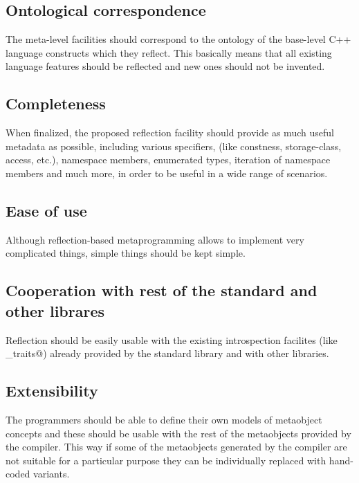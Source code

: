\subsection{Ontological correspondence}

The meta-level facilities should
correspond to the ontology of the base-level C++ language constructs
which they reflect. This basically means that all existing language
features should be reflected and new ones should not be invented.

\subsection{Completeness}

When finalized, the proposed reflection facility should
provide as much useful metadata as possible, including various specifiers,
(like constness, storage-class, access, etc.), namespace members,
enumerated types, iteration of namespace members and much more,
in order to be useful in a wide range of scenarios.

\subsection{Ease of use}

Although reflection-based metaprogramming
allows to implement very complicated things, simple things
should be kept simple.

\subsection{Cooperation with rest of the standard and other librares}

Reflection should be easily
usable with the existing introspection facilites (like \verb@type_traits@)
already provided by the standard library and with other libraries.

\subsection{Extensibility}

The programmers should be able to define their own models of metaobject concepts
and these should be usable with the rest of the metaobjects provided by the
compiler. This way if some of the metaobjects generated by the compiler are not
suitable for a particular purpose they can be individually replaced with
hand-coded variants.

